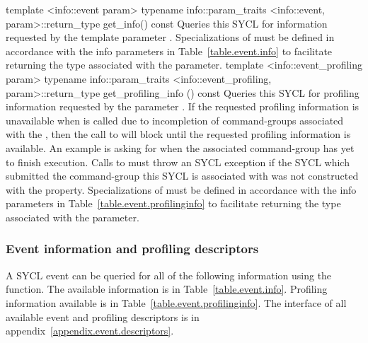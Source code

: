   \addRowFourL
    {template <info::event param>}
    {  typename info::param_traits}
    {  <info::event, param>::return_type}
    {  get_info() const }
    {
      Queries this SYCL  for information requested by the
      template parameter .
      Specializations of  must be defined in
      accordance with the info parameters in Table~\ref{table.event.info} to
      facilitate returning the type associated with the 
      parameter.
    }
  \addRowFourL
    {template <info::event_profiling param>}
    {  typename info::param_traits}
    {  <info::event_profiling, param>::return_type}
    {  get_profiling_info () const }
    {
      Queries this SYCL  for profiling information requested
      by the parameter . If the requested profiling information
      is unavailable when  is called due to
      incompletion of \glspl{command-group} associated with the ,
      then the call to  will block until
      the requested profiling information is available. An example is asking for
       when the associated
      \gls{command-group} has yet to finish execution.
      Calls to  must throw an 
       SYCL exception if the SYCL 
       which submitted the \gls{command-group} this 
      SYCL  is associated with was not constructed with 
      the  property.
      Specializations of  must be defined in
      accordance with the info parameters in
      Table~\ref{table.event.profilinginfo} to facilitate returning the type
      associated with the  parameter.
    }
\completeTable

\subsubsection{Event information and profiling descriptors}
A SYCL event can be queried for all of the following information using the
 function. The available information is in
Table~\ref{table.event.info}. Profiling information available is in
Table~\ref{table.event.profilinginfo}. The interface of all available event and
profiling descriptors is in appendix~\ref{appendix.event.descriptors}.


